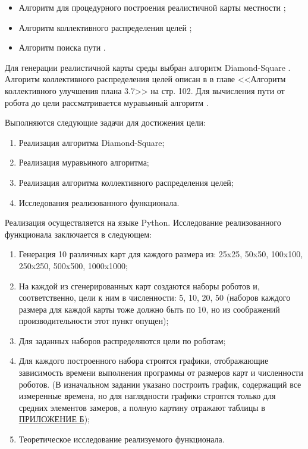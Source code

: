 \documentclass{article}
\numberwithin{equation}{section}
\begin{document}
    \begin{itemize}
        \item Алгоритм для процедурного построения реалистичной карты местности \cite{terrain};
        \item Алгоритм коллективного распределения целей \cite{plan};
        \item Алгоритм поиска пути \cite{path}.
	\end{itemize}

	Для генерации реалистичной карты среды выбран алгоритм Diamond-Square \cite{DS}. Алгоритм коллективного распределения целей описан в \cite{plan} в главе <<Алгоритм коллективного улучшения плана 3.7>> на стр. 102. Для вычисления пути от робота до цели рассматривается муравьиный алгоритм \cite{ant}.

	Выполняются следующие задачи для достижения цели:
	\begin{enumerate}
		\item Реализация алгоритма Diamond-Square;
		\item Реализация муравьиного алгоритма;
		\item Реализация алгоритма коллективного распределения целей;
		\item Исследования реализованного функционала.
	\end{enumerate}

	Реализация осуществляется на языке Python. Исследование реализованного функционала заключается в следующем:

	\begin{enumerate}
		\item Генерация 10 различных карт для каждого размера из: 25x25, 50x50, 100x100, 250x250, 500x500, 1000x1000;
		\item На каждой из сгенерированных карт создаются наборы роботов и, соответственно, цели к ним в численности: 5, 10, 20, 50 (наборов каждого размера для каждой карты тоже должно быть по 10, но из соображений производительности этот пункт опущен);
		\item Для заданных наборов распределяются цели по роботам;
		\item Для каждого построенного набора строятся графики, отображающие зависимость времени выполнения программы от размеров карт и численности роботов. (В изначальном задании указано построить график, содержащий все измеренные времена, но для наглядности графики строятся только для средних элементов замеров, а полную картину отражают таблицы в \hyperref[sec:time]{ПРИЛОЖЕНИЕ Б});
		\item Теоретическое исследование реализуемого функционала.
	\end{enumerate}
\end{document}
